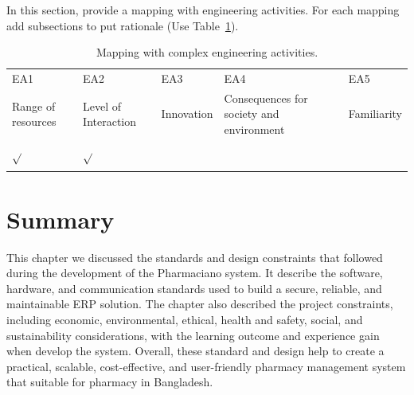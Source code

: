In this section, provide a mapping with engineering activities. For each mapping add subsections to put rationale (Use Table~\ref{tab:e_act}).
\begin{center}
    \begin{table}[ht]
        \centering
                \caption{Mapping with complex engineering activities.}

        \begin{tabular}{|p{}|p{}|p{}|p{}|p{}|}
        \hline
        EA1& EA2& EA3& EA4& EA5\\
        Range of resources & Level of Interaction & Innovation & Consequences for society and environment & Familiarity\\
        \hline 
        $\sqrt{}$ & $\sqrt{}$ &&&\\
        &&&&\\
        \hline 
        \end{tabular}
        \label{tab:e_act}
    \end{table}
\end{center}

\section{Summary}
This chapter we discussed the standards and design constraints that followed during the development of the Pharmaciano system. It describe the software, hardware, and communication standards used to build a secure, reliable, and maintainable ERP solution. The chapter also described the project constraints, including economic, environmental, ethical, health and safety, social, and sustainability considerations, with the learning outcome and experience gain when develop the system. Overall, these standard and design help to create a practical, scalable, cost-effective, and user-friendly pharmacy management system that suitable for pharmacy in Bangladesh.